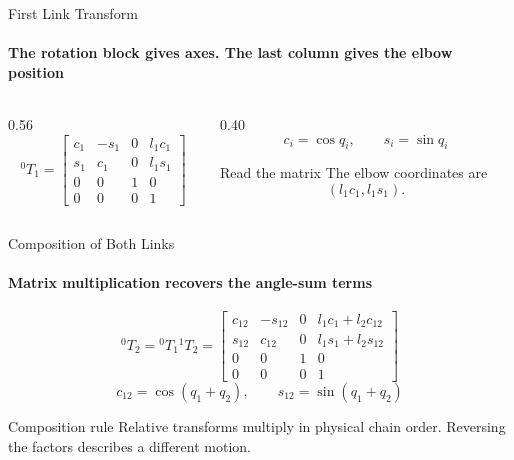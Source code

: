 \documentclass[aspectratio=169]{beamer}
\begin{document}
\begin{frame}[t]{First Link Transform}
    \framesubtitle{The rotation block gives axes. The last column gives the elbow position}
    \begin{columns}[T,onlytextwidth]
        \begin{column}{0.56\textwidth}
            \[
                {}^{0}T_1=
                \begin{bmatrix}
                    c_1 & -s_1 & 0 & l_1c_1\\
                    s_1 &  c_1 & 0 & l_1s_1\\
                    0   &  0   & 1 & 0\\
                    0   &  0   & 0 & 1
                \end{bmatrix}
            \]
        \end{column}
        \begin{column}{0.40\textwidth}
            \[
                c_i=\cos q_i,
                \qquad
                s_i=\sin q_i
            \]
            \begin{block}{Read the matrix}
                The elbow coordinates are
                \[
                    (l_1c_1,l_1s_1).
                \]
            \end{block}
        \end{column}
    \end{columns}
\end{frame}

\begin{frame}[t]{Composition of Both Links}
    \framesubtitle{Matrix multiplication recovers the angle-sum terms}
    \small
    \[
        {}^{0}T_2={}^{0}T_1{}^{1}T_2=
        \begin{bmatrix}
            c_{12} & -s_{12} & 0 & l_1c_1+l_2c_{12}\\
            s_{12} &  c_{12} & 0 & l_1s_1+l_2s_{12}\\
            0      &  0      & 1 & 0\\
            0      &  0      & 0 & 1
        \end{bmatrix}
    \]
    \[
        c_{12}=\cos(q_1+q_2),
        \qquad
        s_{12}=\sin(q_1+q_2)
    \]
    \begin{block}{Composition rule}
        Relative transforms multiply in physical chain order. Reversing the factors describes a different motion.
    \end{block}
\end{frame}
\end{document}
